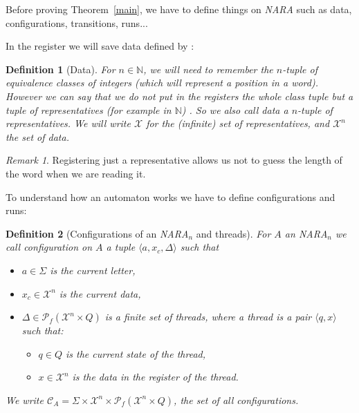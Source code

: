 \documentclass[a4paper,10pt]{report}
\newtheorem{df}{Definition}
\theoremstyle{remark}
\newtheorem{rk}{Remark}
\newcommand{\C}{\mathcal{C}_{A}}
\newcommand{\Xa}{\mathcal{X}}
\newcommand{\X}{\mathcal{X}^{n}}
\begin{document}
Before proving Theorem~\ref{main}, we have to define things on \textit{NARA} such as data, configurations, transitions, runs...


In the register we will save data defined by :  
\begin{df}[Data]
  For $n\in \mathbb N$, we will need to remember the $n$-tuple of equivalence classes of integers (which will represent a position in a word).
  However we can say that we do not put in the registers the whole class tuple but a tuple of representatives (for example in $\mathbb N$) .
  So we also call data a $n$-tuple of representatives.
  We will write $\Xa$ for the (infinite) set of representatives, and $\X$ the set of data.
\end{df}

\begin{rk}
 Registering just a representative allows us not to guess the length of the word when we are reading it.
\end{rk}

To understand how an automaton works we have to define configurations and runs: 

\begin{df}[Configurations of an \textit{NARA}$_n$ and threads]
For $A$ an \textit{NARA}$_n$ we call configuration on $A$ a tuple  
 $\langle  a ,x_c, \Delta    \rangle$
 such that 
  \begin{itemize}
    \item $a \in \Sigma$ is the current letter, 
    \item $x_c\in  \X$ is the current data, 
    \item $\Delta \in \mathcal{P}_f(\X \times Q)$ is a finite set of threads, where a thread is a pair  
    $\langle q,x  \rangle$ such that:
      \begin{itemize}
	\item $q \in Q$ is the current state of the thread,
	\item $x\in  \X $ is the data in the register of the thread.
      \end{itemize}
   \end{itemize}
 We write $\C =  \Sigma \times \X \times \mathcal{P}_f(\X \times Q)$, the set of all configurations.
\end{df}
\end{document}
